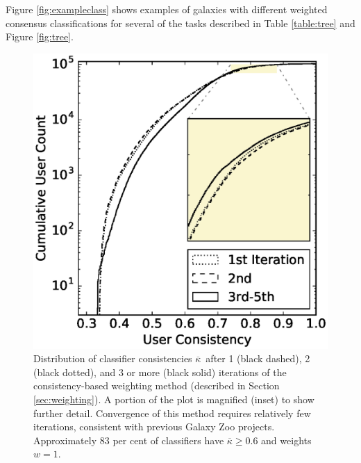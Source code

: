 \documentclass[useAMS,usenatbib]{mn2e}
\def\kappamean {$\overline{\kappa}$}
\def\mkappamean {\overline{\kappa}}
\begin{document}
{Figure \ref{fig:exampleclass} shows examples of galaxies with different weighted consensus classifications for several of the tasks described in Table \ref{table:tree} and Figure \ref{fig:tree}. 

\begin{figure}
\includegraphics[scale=0.625]{consistencies_iterations2.eps}
\caption{
Distribution of classifier consistencies \kappamean\ after 1 (black dashed), 2 (black dotted), and 3 or more (black solid) iterations of the consistency-based weighting method (described in Section \ref{sec:weighting}). A portion of the plot is magnified (inset) to show further detail. Convergence of this method requires relatively few iterations, consistent with previous Galaxy Zoo projects. Approximately 83 per cent of classifiers have $\mkappamean \geq 0.6$ and weights $w = 1$. 
}
\label{fig:consistencies}
\end{figure}


}
\end{document}
